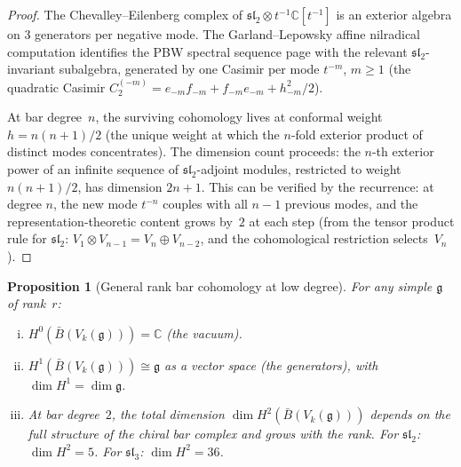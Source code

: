 \documentclass[11pt]{article}
\theoremstyle{plain}
\newtheorem{proposition}[theorem]{Proposition}
\theoremstyle{definition}
\theoremstyle{remark}
\newcommand{\fg}{\mathfrak{g}}
\newcommand{\fsl}{\mathfrak{sl}}
\newcommand{\barB}{\bar{B}}
\numberwithin{equation}{section}
\begin{document}
\begin{proof}
The Chevalley--Eilenberg complex of
$\fsl_2 \otimes t^{-1}\mathbb{C}[t^{-1}]$ is an
exterior algebra on $3$ generators per negative mode.
The Garland--Lepowsky affine nilradical computation identifies the
PBW spectral sequence page with the relevant $\fsl_2$-invariant
subalgebra, generated by one Casimir per mode $t^{-m}$, $m \geq 1$ (the
quadratic Casimir $C_2^{(-m)} = e_{-m} f_{-m}
+ f_{-m} e_{-m} + h_{-m}^2/2$).

At bar degree~$n$, the surviving cohomology lives at
conformal weight $h = n(n{+}1)/2$ (the unique weight
at which the $n$-fold exterior product of distinct
modes concentrates). The dimension count proceeds:
the $n$-th exterior power of an infinite sequence of
$\fsl_2$-adjoint modules, restricted to weight
$n(n{+}1)/2$, has dimension $2n+1$. This can be
verified by the recurrence: at degree $n$, the new mode
$t^{-n}$ couples with all $n{-}1$ previous modes,
and the representation-theoretic content grows by~$2$
at each step (from the tensor product rule for
$\fsl_2$: $V_1 \otimes V_{n-1}
= V_n \oplus V_{n-2}$, and the cohomological
restriction selects~$V_n$).
\end{proof}

\begin{proposition}[General rank bar cohomology at low degree]
\label{prop:low-degree-general}
For any simple $\fg$ of rank~$r$:
\begin{enumerate}[(i)]
\item $H^0(\barB(V_k(\fg))) = \mathbb{C}$
 \textup{(}the vacuum\textup{)}.
\item $H^1(\barB(V_k(\fg))) \cong \fg$ as a vector
 space \textup{(}the generators\textup{)},
 with $\dim H^1 = \dim\fg$.
\item At bar degree~$2$, the total dimension
 $\dim H^2(\barB(V_k(\fg)))$ depends on the full
 structure of the chiral bar complex and grows with
 the rank. For $\fsl_2$: $\dim H^2 = 5$.
 For $\fsl_3$: $\dim H^2 = 36$.
\end{enumerate}
\end{proposition}
\end{document}
